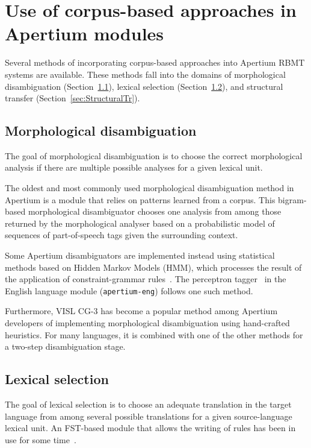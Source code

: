 \documentclass[free]{flammie}
\begin{document}
\section{Use of corpus-based approaches in Apertium modules}
\label{sec:HyberdisationOFApertium}

Several methods of incorporating corpus-based approaches into Apertium RBMT
systems are available. These methods fall into the domains of morphological
disambiguation (Section~\ref{sec:MorphologicalDis}), lexical selection
(Section~\ref{sec:lexicalSel}), and structural transfer
(Section~\ref{sec:StructuralTr}).

\subsection{Morphological disambiguation}\label{sec:MorphologicalDis}

The goal of morphological disambiguation is to choose the correct morphological
analysis if there are multiple possible analyses for a given lexical unit.

The oldest and most commonly used morphological disambiguation method in
Apertium \cite{sanchez2006speeding, sanchez2007training} is a module that relies on patterns
learned from a corpus. This bigram-based morphological disambiguator chooses one
analysis from among those returned by the morphological analyser based on a
probabilistic model of sequences of part-of-speech tags given the surrounding
context.

Some Apertium disambiguators are implemented instead using statistical methods
based on Hidden Markov Models (HMM), which processes the result of the
application of constraint-grammar rules~\cite{karlsson1995constraint}. The
perceptron tagger~\cite{zhang2011syntactic} in the English language
module (\texttt{apertium-eng}) follows one such method.

Furthermore, VISL CG-3 \cite{bick2015cg} has become a popular method among
Apertium developers of implementing morphological disambiguation using
hand-crafted heuristics.  For many languages, it is combined with one of the
other methods for a two-step disambiguation stage.

\subsection{Lexical selection}\label{sec:lexicalSel}

The goal of lexical selection is to choose an adequate translation in the target
language from among several possible translations for a given source-language
lexical unit.  An FST-based module that allows the writing of rules has been in
use for some time~\cite{tyers2012flexible}.
\end{document}

